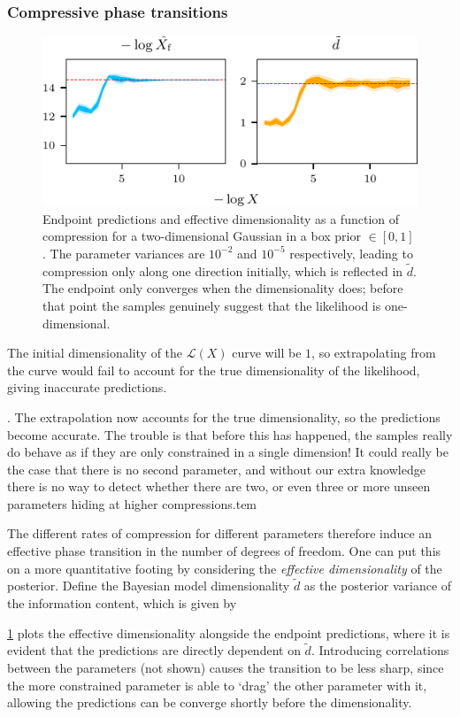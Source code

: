 \documentclass[usenatbib]{mnras}
\begin{document}
\subsubsection*{Compressive phase transitions}
\begin{figure}
\begin{center}
\includegraphics{figures/phase_transition.pdf}
\end{center}
\caption{Endpoint predictions and effective dimensionality as a function of compression for a two-dimensional Gaussian in a box prior $\in [0, 1]$. The parameter variances are $10^{-2}$ and $10^{-5}$ respectively, leading to compression only along one direction initially, which is reflected in $\tilde{d}$. The endpoint only converges when the dimensionality does; before that point the samples genuinely suggest that the likelihood is one-dimensional.}
\label{fig:phase_transition}
\end{figure}
The initial dimensionality of the $\mathcal{L}(X)$ curve will be $1$, so extrapolating from the curve would fail to account for the true dimensionality of the likelihood, giving inaccurate predictions.
\par
. The extrapolation now accounts for the true dimensionality, so the predictions become accurate. The trouble is that before this has happened, the samples really do behave as if they are only constrained in a single dimension! It could really be the case that there is no second parameter, and without our extra knowledge there is no way to detect whether there are two, or even three or more unseen parameters hiding at higher compressions.tem
\par
The different rates of compression for different parameters therefore induce an effective phase transition in the number of degrees of freedom. One can put this on a more quantitative footing by considering the \textit{effective dimensionality} of the posterior. Define the Bayesian model dimensionality $\tilde{d}$ as the posterior variance of the information content, which is given by
\par
\cref{fig:phase_transition} plots the effective dimensionality alongside the endpoint predictions, where it is evident that the predictions are directly dependent on $\tilde{d}$. Introducing correlations between the parameters (not shown) causes the transition to be less sharp, since the more constrained parameter is able to `drag' the other parameter with it, allowing the predictions can be converge shortly before the dimensionality.
\end{document}
